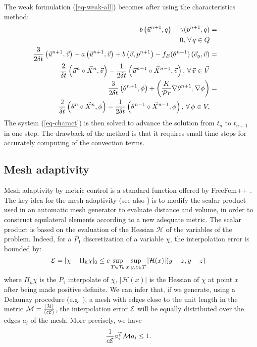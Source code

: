 The weak formulation  (\ref{eq-weak-all}) becomes after using the characteristics method:
\begin{eqnarray}
\label{eq-charact}
b\left(\vec{u}^{n+1}, q\right) - \gamma (p^{n+1},q)&=& \\ \nonumber
0, \, \forall \, q \in Q \\ \nonumber
\frac{3}{2 \delta t} \left(\vec{u}^{n+1},\vec{v}\right) +
a\left(\vec{u}^{n+1}, \vec{v}\right) 
+ b\left(\vec{v}, p^{n+1}\right) 
- f_B(\theta^{n+1}) \left(\vec{e}_y,\vec{v}\right)
&=& \\ \nonumber
\frac{2}{\delta t} \left(\vec{u}^{n}\circ \vec{X}^n,\vec{v}\right) - \frac{1}{2 \delta t} \left(\vec{u}^{n-1}\circ \vec{X}^{n-1},\vec{v}\right), \, \forall \, \vec{v} \in \vec{V}\\  \nonumber
\frac{3}{2 \delta t} \left(\theta^{n+1}, \phi\right)  
+
\left( \frac{K}{{\cal P}r} \nabla \theta^{n+1}, \nabla \phi \right) &=& \\ \nonumber
 \frac{2}{\delta t} \left(\theta^{n}\circ \vec{X}^n, \phi\right) -  \frac{1}{2 \delta t} \left(\theta^{n-1}\circ \vec{X}^{n-1}, \phi\right), \, \forall \, \phi \in V,
\end{eqnarray}
The system (\ref{eq-charact}) is then solved to advance the solution from $t_n$ to $t_{n+1}$ in one step. The drawback of the method is that it requires small time steps for accurately computing of the convection terms. 

 \subsection{Mesh adaptivity} \label{subs:FEadapt}

Mesh adaptivity by metric control is a standard function offered by FreeFem++ \citep{hecht-2012-JNM}. The key idea for the mesh adaptivity (see also \cite{hecht-2000-ijnmf,hecht-1997-aiaa,george-1998}) is to modify the scalar product used in an automatic mesh generator to evaluate distance and volume, in order to  construct equilateral elements according to a new adequate metric.  The scalar
product is based on the evaluation of the Hessian $\mathcal{H}$ of the variables of the problem. Indeed, for a $P_1$ discretization of a
variable $\chi$, the interpolation error is bounded by:
\begin{equation}
{\cal E } = |\chi - \Pi_h \chi |_0 \leq c \sup_{T\in \mathcal{T}_{h}} \sup_{x,y,z\in T}   |\mathcal{H}(x)|(y-z , y-z)
\label{eq1}
\end{equation}
where $\Pi_h \chi $ is the $P_1$ interpolate  of $\chi$, $ |\mathcal{H}(x)|$ is the  Hessian of $\chi$ at point $x$ after being made positive definite.
We can infer that, if we generate, using  a Delaunay procedure (e.g. \cite{george-1998}), a  mesh with edges close to the unit length  in the metric  $\mathcal{M} ={|\mathcal{H}| \over (c {\cal{E}})}$, the interpolation error ${\cal E}$ will be equally distributed over the edges $a_i$ of the mesh. More precisely, we have
\begin{equation}
{1 \over c {\cal E}} a_i^T {\cal M } a_i \le 1.
\end{equation}

